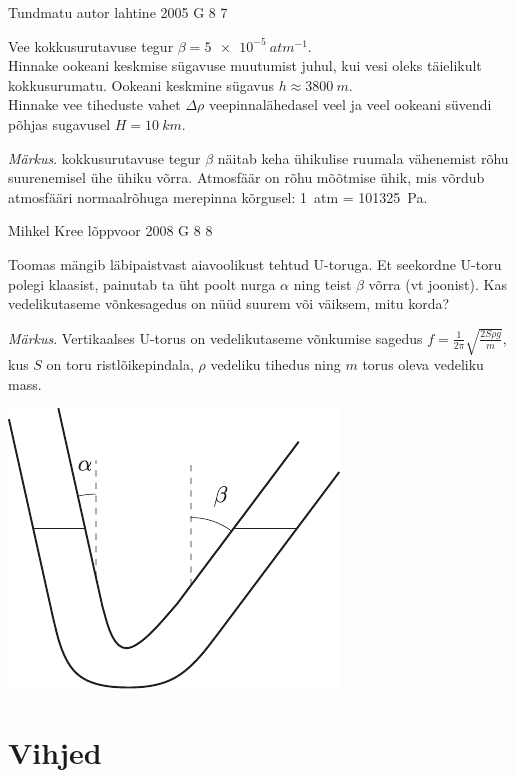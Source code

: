 \documentclass[11pt]{article}
\begin{document}
{%
{Tundmatu autor} %
{lahtine} %
{2005} %
{G 8} %
{7} %
{
\ifStatement
Vee kokkusurutavuse tegur $\beta = \SI{5e-5}{atm^{-1}}$.\\
\osa Hinnake ookeani keskmise sügavuse muutumist juhul, kui vesi oleks täielikult kokkusurumatu. Ookeani keskmine sügavus $h \approx \SI{3800}{m}$.\\
\osa Hinnake vee tiheduste vahet $\Delta \rho$ veepinnalähedasel veel ja veel ookeani süvendi põhjas sugavusel $H = \SI{10}{km}$. 

\emph{Märkus}. kokkusurutavuse tegur $\beta$ näitab keha ühikulise ruumala vähenemist rõhu suurenemisel ühe ühiku võrra. Atmosfäär on rõhu mõõtmise ühik, mis võrdub atmosfääri normaalrõhuga merepinna kõrgusel: \SI{1}{atm} = \SI{101325}{Pa}.
\fi
}

{Mihkel Kree} %
{lõppvoor} %
{2008} %
{G 8} %
{8} %
{
\ifStatement
Toomas mängib läbipaistvast aiavoolikust tehtud U-toruga. Et seekordne U-toru polegi klaasist, painutab ta üht poolt nurga $\alpha$ ning teist $\beta$ võrra (vt joonist). Kas vedelikutaseme võnkesagedus on nüüd suurem või väiksem, mitu korda? 

\emph{Märkus}. Vertikaalses U-torus on vedelikutaseme võnkumise sagedus $f = \frac{1}{2\pi} \sqrt{\frac{2S\rho g}{m}}$, kus $S$ on toru ristlõikepindala, $\rho$ vedeliku tihedus ning $m$ torus oleva vedeliku mass.

\begin{center}
	\includegraphics[width=0.5\linewidth]{2008-v3g-08-yl}
\end{center}
\fi
}
\newpage\normalsize\section{Vihjed}
        \ToggleHint
        
}
\end{document}
